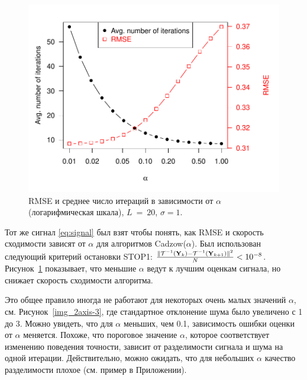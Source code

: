 \documentclass[12pt, specialist, subf,href,colorlinks=true,substylefile = spbu.rtx]{disser}
\theoremstyle{remark}
\theoremstyle{definition}
\begin{document}
\smallskip
\begin{figure}[!hhh]
	\includegraphics[width = \columnwidth]{2axis.pdf}
	\caption{RMSE и среднее число итераций в зависимости от $\alpha$ (логарифмическая шкала), $L~=~20$, $\sigma=1$.}
	\label{img_2axis}
\end{figure}
Тот же сигнал \eqref{eq:signal} был взят чтобы понять, как RMSE и скорость сходимости зависят от $\alpha$ для алгоритмов Cadzow($\alpha$). Был использован следующий критерий остановки STOP1: $\frac{\|\mathcal{T}^{-1}(\mathbf{Y}_k) - \mathcal{T}^{-1}(\mathbf{Y}_{k + 1})\|^2}{N} < 10^{-8}$. Рисунок~\ref{img_2axis} показывает, что меньшие $\alpha$ ведут к лучшим оценкам сигнала, но снижает скорость сходимости алгоритма.

Это общее правило иногда не работают для некоторых очень малых значений $\alpha$, см. Рисунок~\ref{img_2axis-3}, где стандартное отклонение шума было увеличено с 1 до 3. Можно увидеть, что для $\alpha$ меньших, чем 0.1, зависимость ошибки оценки от $\alpha$ меняется.
Похоже, что пороговое значение $\alpha$, которое соответствует изменению поведения точности, зависит от разделимости сигнала и шума на одной итерации.
Действительно, можно ожидать,  что для небольших $\alpha$ качество разделимости плохое (см. пример в Приложении).
\end{document}
